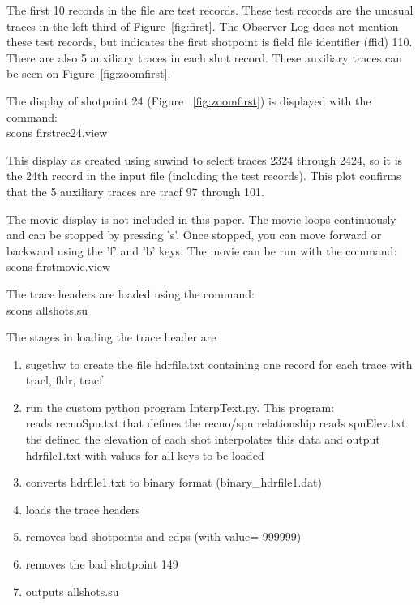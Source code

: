 The first 10 records in the file are test records.  These test
records are the unusual traces in the left third of
Figure~\ref{fig:first}. The Observer Log does not mention these test
records, but indicates the first shotpoint is field file identifier 
(ffid) 110.  There are also 5 auxiliary traces in each shot record.  
These auxiliary traces can be seen on Figure~\ref{fig:zoomfirst}. 

The display of shotpoint 24 (Figure ~\ref{fig:zoomfirst}) is displayed 
with the command: \\
scons firstrec24.view

This display as created using suwind to select traces 2324 through 2424, 
so it is the 24th record in the input file (including the test records). 
This plot confirms that the 5 auxiliary traces are tracf 97 through 101.


The movie display is not included in this paper.  The movie loops 
continuously and can be stopped by pressing 's'.  Once stopped, you 
can move forward or backward using the 'f' and 'b' keys.  The movie can be 
run with the command:\\
scons firstmovie.view


The trace headers are loaded using the command:\\
scons allshots.su

The stages in loading the trace header are
\begin{enumerate}
\item sugethw to create the file hdrfile.txt containing one record for 
each trace with tracl, fldr, tracf
\item run the custom python program InterpText.py.  This program:\\
reads recnoSpn.txt that defines the recno/spn relationship
reads spnElev.txt  the defined the elevation of each shot
interpolates this data and output hdrfile1.txt with values for all keys
to be loaded
\item converts hdrfile1.txt to binary format (binary\_hdrfile1.dat)
\item loads the trace headers
\item removes bad shotpoints and cdps (with value=-999999)
\item removes the bad shotpoint 149
\item outputs allshots.su
\end{enumerate}

